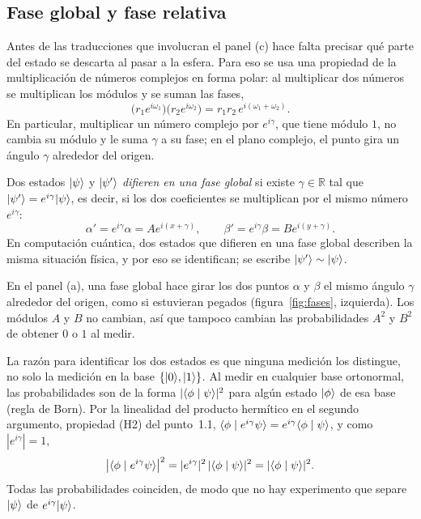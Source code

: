 \subsection*{Fase global y fase relativa}

Antes de las traducciones que involucran el panel (c) hace falta precisar qué parte del estado
se descarta al pasar a la esfera. Para eso se usa una propiedad de la multiplicación de números
complejos en forma polar: al multiplicar dos números se multiplican los módulos y se suman las
fases,
\[
  \bigl(r_1e^{i\omega_1}\bigr)\bigl(r_2e^{i\omega_2}\bigr)=r_1r_2\,e^{i(\omega_1+\omega_2)} .
\]
En particular, multiplicar un número complejo por $e^{i\gamma}$, que tiene módulo $1$, no cambia
su módulo y le suma $\gamma$ a su fase; en el plano complejo, el punto gira un ángulo $\gamma$
alrededor del origen.

\begin{definicionT}
Dos estados $\lvert \psi\rangle$ y $\lvert \psi'\rangle$ \emph{difieren en una fase global} si existe
$\gamma\in\mathbb R$ tal que $\lvert \psi'\rangle=e^{i\gamma}\lvert \psi\rangle$, es decir, si los dos coeficientes
se multiplican por el mismo número $e^{i\gamma}$:
\[
  \alpha'=e^{i\gamma}\alpha=Ae^{i(x+\gamma)},\qquad \beta'=e^{i\gamma}\beta=Be^{i(y+\gamma)} .
\]
En computación cuántica, dos estados que difieren en una fase global describen la misma
situación física, y por eso se identifican; se escribe $\lvert \psi'\rangle\sim\lvert \psi\rangle$.
\end{definicionT}

En el panel (a), una fase global hace girar los dos puntos $\alpha$ y $\beta$ el mismo ángulo
$\gamma$ alrededor del origen, como si estuvieran pegados (figura~\ref{fig:fases}, izquierda).
Los módulos $A$ y $B$ no cambian, así que tampoco cambian las probabilidades $A^2$ y $B^2$ de
obtener $0$ o $1$ al medir.

La razón para identificar los dos estados es que ninguna medición los distingue, no solo la
medición en la base $\{\lvert 0\rangle,\lvert 1\rangle\}$. Al medir en cualquier base ortonormal, las probabilidades
son de la forma $|\langle \phi\mid \psi\rangle|^2$ para algún estado $\lvert \phi\rangle$ de esa base (regla de Born). Por
la linealidad del producto hermítico en el segundo argumento, propiedad (H2) del punto~1.1,
$\langle \phi\mid e^{i\gamma}\psi\rangle=e^{i\gamma}\langle \phi\mid \psi\rangle$, y como $|e^{i\gamma}|=1$,
\[
  \bigl|\langle \phi\mid e^{i\gamma}\psi\rangle\bigr|^2=|e^{i\gamma}|^2\,|\langle \phi\mid \psi\rangle|^2=|\langle \phi\mid \psi\rangle|^2 .
\]
Todas las probabilidades coinciden, de modo que no hay experimento que separe $\lvert \psi\rangle$ de
$e^{i\gamma}\lvert \psi\rangle$.

